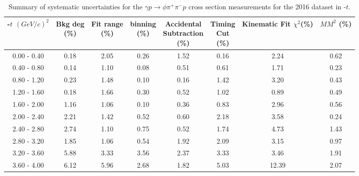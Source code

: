 \begin{center}
\begin{table}[!htbp]
    \small
    \centering
    \caption{Summary of systematic uncertainties for the $\gamma p \rightarrow \phi \pi^{+} \pi^{-} p$ cross section measurements for the 2016 dataset in -$t$.}
    \label{tab.y2175.syserr.phi2pi.1.2}
    \begin{tabular}{|c|c|c|c|c|c|c|c|}
        \hline
        -$t$ $(GeV/c)^{2}$&\thead{Bkg deg\\(\%)}&\thead{Fit range\\(\%)}&\thead{binning\\(\%)}&\thead{Accidental\\Subtraction\\(\%)}&\thead{Timing\\Cut\\(\%)}&\thead{Kinematic\\Fit $\chi^{2}$(\%)}&\thead{$MM^{2}$\\(\%)}\\
        \hline
        0.00 - 0.40 & 0.18 & 2.05 & 0.26 & 1.52 & 0.16 & 2.24 & 0.62 \\ 
        0.40 - 0.80 & 0.14 & 1.10 & 0.08 & 0.51 & 0.61 & 1.71 & 0.23 \\ 
        0.80 - 1.20 & 0.23 & 1.48 & 0.10 & 0.16 & 1.42 & 3.20 & 0.43 \\ 
        1.20 - 1.60 & 0.18 & 1.66 & 0.30 & 0.52 & 1.02 & 0.89 & 0.49 \\ 
        1.60 - 2.00 & 1.16 & 1.06 & 0.10 & 0.36 & 0.83 & 2.96 & 0.56 \\ 
        2.00 - 2.40 & 2.21 & 1.42 & 0.52 & 0.60 & 2.18 & 3.58 & 0.24 \\ 
        2.40 - 2.80 & 2.74 & 1.10 & 0.75 & 0.52 & 1.74 & 4.73 & 1.43 \\ 
        2.80 - 3.20 & 1.85 & 1.06 & 0.54 & 1.92 & 2.09 & 3.15 & 0.97 \\ 
        3.20 - 3.60 & 5.88 & 3.33 & 3.56 & 2.37 & 3.33 & 3.46 & 1.91 \\ 
        3.60 - 4.00 & 6.12 & 5.96 & 2.68 & 1.82 & 5.03 & 12.39 & 2.07 \\
        \hline
    \end{tabular}
\end{table}
\null
\vfill
\end{center}

